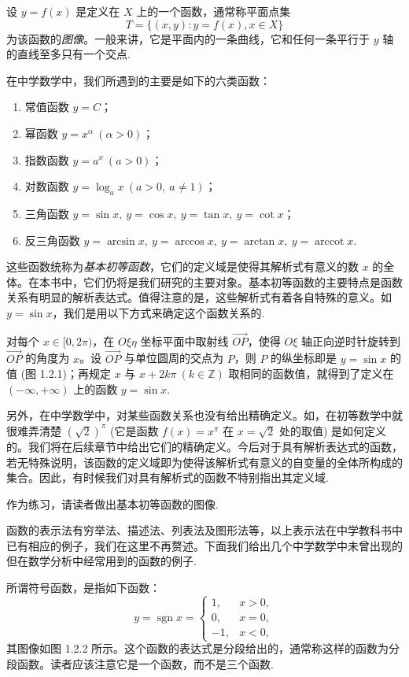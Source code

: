 设 $y=f(x)$ 是定义在 $X$ 上的一个函数，通常称平面点集
\[
  T=\{(x,y):y=f(x),x\in X\}
\]
为该函数的\emph{图像}。一般来讲，它是平面内的一条曲线，它和任何一条平行于 $y$ 轴的直线至多只有一个交点.

在中学数学中，我们所遇到的主要是如下的六类函数：
\begin{enumerate}
  \item 常值函数 $y=C$；
  \item 幂函数 $y=x^\alpha\ (\alpha>0)$；
  \item 指数函数 $y=a^x\ (a>0)$；
  \item 对数函数 $y=\log_a x\ (a>0,\ a\ne1)$；
  \item 三角函数 $y=\sin x,\ y=\cos x,\ y=\tan x,\ y=\cot x$；
  \item 反三角函数 $y=\arcsin x,\ y=\arccos x,\ y=\arctan x,\ y=\operatorname{arccot} x$.
\end{enumerate}
这些函数统称为\emph{基本初等函数}，它们的定义域是使得其解析式有意义的数 $x$ 的全体。在本书中，它们仍将是我们研究的主要对象。基本初等函数的主要特点是函数关系有明显的解析表达式。值得注意的是，这些解析式有着各自特殊的意义。如 $y=\sin x$，我们是用以下方式来确定这个函数关系的.

对每个 $x\in[0,2\pi)$，在 $O\xi\eta$ 坐标平面中取射线 $\overrightarrow{OP}$，使得 $O\xi$ 轴正向逆时针旋转到 $\overrightarrow{OP}$ 的角度为 $x$。设 $\overrightarrow{OP}$ 与单位圆周的交点为 $P$，则 $P$ 的纵坐标即是 $y=\sin x$ 的值 (图 1.2.1)；再规定 $x$ 与 $x+2k\pi\ (k\in\mathbb{Z})$ 取相同的函数值，就得到了定义在 $(-\infty,+\infty)$ 上的函数 $y=\sin x$.

另外，在中学数学中，对某些函数关系也没有给出精确定义。如，在初等数学中就很难弄清楚 $(\sqrt2)^\pi$ (它是函数 $f(x)=x^\pi$ 在 $x=\sqrt2$ 处的取值) 是如何定义的。我们将在后续章节中给出它们的精确定义。今后对于具有解析表达式的函数，若无特殊说明，该函数的定义域即为使得该解析式有意义的自变量的全体所构成的集合。因此，有时候我们对具有解析式的函数不特别指出其定义域.

作为练习，请读者做出基本初等函数的图像.

函数的表示法有穷举法、描述法、列表法及图形法等，以上表示法在中学教科书中已有相应的例子，我们在这里不再赘述。下面我们给出几个中学数学中未曾出现的但在数学分析中经常用到的函数的例子.

\begin{example}[{符号函数}]\label{example:ma-1-2-1}
所谓符号函数，是指如下函数：
\[
  y=\operatorname{sgn}x=
  \begin{cases}
    1, & x>0,\\
    0, & x=0,\\
    -1, & x<0,
  \end{cases}
\]
其图像如图 1.2.2 所示。这个函数的表达式是分段给出的，通常称这样的函数为分段函数。读者应该注意它是一个函数，而不是三个函数.
\end{example}


